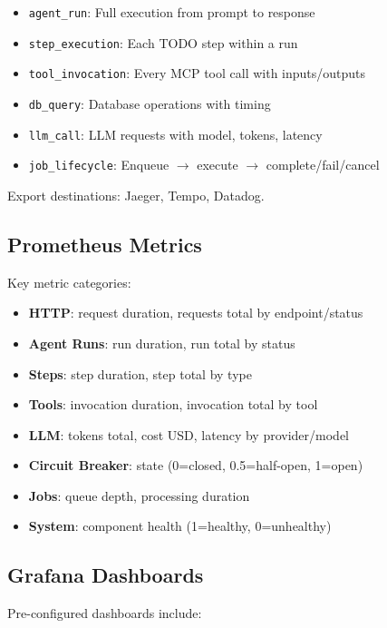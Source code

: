 \documentclass[a4paper,twoside]{sapthesis}
\begin{document}
\begin{itemize}
    \item \texttt{agent\_run}: Full execution from prompt to response
    \item \texttt{step\_execution}: Each TODO step within a run
    \item \texttt{tool\_invocation}: Every MCP tool call with inputs/outputs
    \item \texttt{db\_query}: Database operations with timing
    \item \texttt{llm\_call}: LLM requests with model, tokens, latency
    \item \texttt{job\_lifecycle}: Enqueue $\rightarrow$ execute $\rightarrow$ complete/fail/cancel
\end{itemize}

Export destinations: Jaeger, Tempo, Datadog.

\subsection{Prometheus Metrics}
\label{subsec:prometheus-metrics}

Key metric categories:

\begin{itemize}
    \item \textbf{HTTP}: request duration, requests total by endpoint/status
    \item \textbf{Agent Runs}: run duration, run total by status
    \item \textbf{Steps}: step duration, step total by type
    \item \textbf{Tools}: invocation duration, invocation total by tool
    \item \textbf{LLM}: tokens total, cost USD, latency by provider/model
    \item \textbf{Circuit Breaker}: state (0=closed, 0.5=half-open, 1=open)
    \item \textbf{Jobs}: queue depth, processing duration
    \item \textbf{System}: component health (1=healthy, 0=unhealthy)
\end{itemize}

\subsection{Grafana Dashboards}
\label{subsec:grafana-dashboards}

Pre-configured dashboards include:
\end{document}
